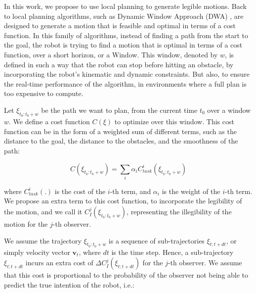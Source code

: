 \vspace{0.3cm}

In this work, we propose to use local planning to generate legible motions.
Back to local planning algorithms, such as Dynamic Window Approach (DWA) \cite{DWA1997}, are designed to generate a motion that is feasible and optimal in terms of a cost function.
%
In this family of algorithms, instead of finding a path from the start to the goal,
the robot is trying to find a motion that is optimal in terms of a cost function, over a short horizon, or a Window.
This window, denoted by $w$, is defined in such a way that the robot can stop before hitting an obstacle,
by incorporating the robot's kinematic and dynamic constraints.
But also, to ensure the real-time performance of the algorithm, in environments where a full plan is too expensive to compute.

Let $\xi_{t_0:t_0+w}$ be the path we want to plan, from the current time $t_0$ over a window $w$.
We define a cost function
$C(\xi)$
to optimize over this window.
This cost function can be in the form of a weighted sum of different terms, such as the distance to the goal, the distance to the obstacles, and the smoothness of the path:

\begin{equation}
    \label{eq:cost_general}
    C(\xi_{t_0:t_0+w}) = \sum_i \alpha_i C_{task}^i(\xi_{t_0:t_0+w})
\end{equation}

\noindent
where $C_{task}^i(.)$ is the cost of the $i$-th term, and $\alpha_i$ is the weight of the $i$-th term.
%
We propose an extra term to this cost function, to incorporate the legibility of the motion,
and we call it $C_{I}^j(\xi_{t_0:t_0+w})$, representing the illegibility of the motion for the $j$-th observer.


We assume the trajectory $\xi_{t_0:t_0+w}$ is a sequence of sub-trajectories $\xi_{t:t+dt}$, or simply velocity vector $\mathbf{v}_t$, where $dt$ is the time step.
Hence, a sub-trajectory $\xi_{t:t+dt}$ incurs an extra cost of $\Delta C_{I}^j(\xi_{t:t+dt})$ for the $j$-th observer.
We assume that this cost is proportional to the probability of the observer not being able to predict the true intention of the robot, i.e.:

